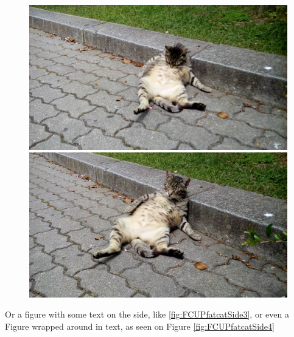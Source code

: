 \begin{figure}
\centering
\begin{minipage}{.49\textwidth}
  \centering
  \includegraphics[width=.95\linewidth]{Figures/ChapterTemplate/20160517_123603.jpg}
\end{minipage}%
\hfill
\begin{minipage}{.49\textwidth}
  \centering
  \includegraphics[width=.95\linewidth]{Figures/ChapterTemplate/20160517_123609.jpg}
\end{minipage}
\end{figure}


Or a figure with some text on the side, like \ref{fig:FCUPfatcatSide3}, or even a Figure wrapped around in text, as seen on Figure \ref{fig:FCUPfatcatSide4}

